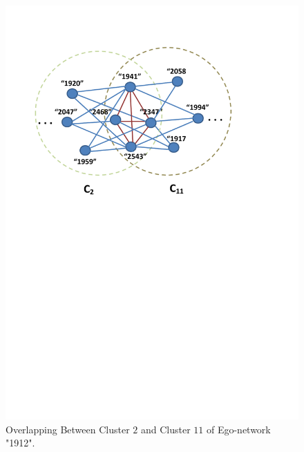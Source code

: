 \begin{table}[h]
\label{tab:overlapping}
\end{table}

\begin{figure}[h]
\centering
\includegraphics[width = 0.6\columnwidth]{figure/graph.pdf}
\vspace{-3mm}
\caption{Overlapping Between Cluster $2$ and Cluster $11$ of Ego-network "1912".}
\label{fig:overlapping}
\end{figure}

